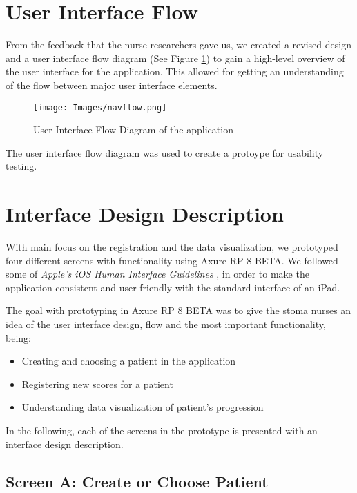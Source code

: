 \section{User Interface Flow}
From the feedback that the nurse researchers gave us, we created a revised design and a user interface flow diagram (See Figure \ref{fig:UIflow}) to gain a high-level overview of the user interface for the application. This allowed for getting an understanding of the flow between major user interface elements. 


\begin{figure}[!h] \centering
			\texttt{[image: Images/navflow.png]}
		\caption{User Interface Flow Diagram of the application} \label{fig:UIflow}
\end{figure}

The user interface flow diagram was used to create a protoype for usability testing. 

\section{Interface Design Description}

With main focus on the registration and the data visualization, we prototyped four different screens with functionality using Axure RP 8 BETA. We followed some of \textit{Apple's iOS Human Interface Guidelines} \citep{apple}, in order to make the application consistent and user friendly with the standard interface of an iPad. 

The goal with prototyping in Axure RP 8 BETA was to give the stoma nurses an idea of the user interface design, flow and the most important functionality, being: 

\begin{itemize}
\item Creating and choosing a patient in the application
\item Registering new scores for a patient 
\item Understanding data visualization of patient's progression
\end{itemize}

In the following, each of the screens in the prototype is  presented with an interface design description. 
\newpage


\subsection*{Screen A: Create or Choose Patient}

